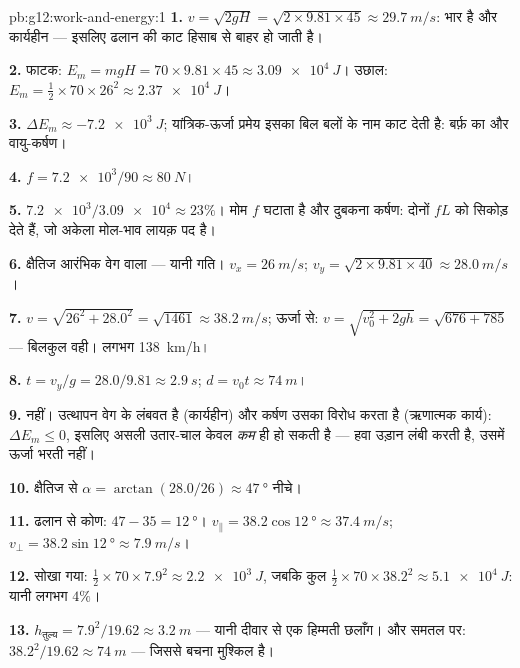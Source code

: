 \begin{solution}{pb:g12:work-and-energy:1}
\textbf{1.} $v = \sqrt{2gH} = \sqrt{2 \times 9.81 \times 45} \approx
\qty{29.7}{m/s}$: भार  है और 
कार्यहीन --- इसलिए ढलान की काट हिसाब से बाहर हो जाती है।

\textbf{2.} फाटक: $E_m = mgH = 70 \times 9.81 \times 45 \approx
\qty{3.09e4}{J}$। उछाल: $E_m = \tfrac12 \times 70 \times 26^2
\approx \qty{2.37e4}{J}$।

\textbf{3.} $\Delta E_m \approx \qty{-7.2e3}{J}$; यांत्रिक-ऊर्जा प्रमेय इसका बिल 
बलों के नाम काट देती है: बर्फ़ का  और वायु-कर्षण।

\textbf{4.} $f = \num{7.2e3}/90 \approx \qty{80}{N}$।

\textbf{5.} $\num{7.2e3}/\num{3.09e4} \approx 23\%$। मोम $f$ घटाता है और दुबकना कर्षण: दोनों $fL$ को
सिकोड़ देते हैं, जो अकेला मोल-भाव लायक़ पद है।

\textbf{6.} क्षैतिज आरंभिक वेग वाला  --- यानी
 गति। $v_x = \qty{26}{m/s}$; $v_y = \sqrt{2 \times 9.81 \times 40} \approx \qty{28.0}{m/s}$।

\textbf{7.} $v = \sqrt{26^2 + 28.0^2} = \sqrt{1461} \approx
\qty{38.2}{m/s}$; ऊर्जा से: $v = \sqrt{v_0^2 + 2gh} = \sqrt{676 + 785}$ --- बिलकुल वही। लगभग \qty{138}{km/h}।

\textbf{8.} $t = v_y/g = 28.0/9.81 \approx \qty{2.9}{s}$; $d = v_0 t \approx \qty{74}{m}$।

\textbf{9.} नहीं। उत्थापन वेग के लंबवत है (कार्यहीन) और कर्षण उसका विरोध करता
है (ऋणात्मक कार्य): $\Delta E_m \leq 0$, इसलिए असली उतार-चाल केवल \emph{कम} ही
हो सकती है --- हवा उड़ान लंबी करती है, उसमें ऊर्जा भरती नहीं।

\textbf{10.} क्षैतिज से $\alpha = \arctan(28.0/26) \approx \qty{47}{\degree}$ नीचे।

\textbf{11.} ढलान से कोण: $47 - 35 = \qty{12}{\degree}$। $v_\parallel = 38.2\cos\qty{12}{\degree} \approx \qty{37.4}{m/s}$; $v_\perp = 38.2\sin\qty{12}{\degree} \approx \qty{7.9}{m/s}$।

\textbf{12.} सोखा गया: $\tfrac12 \times 70 \times 7.9^2 \approx
\qty{2.2e3}{J}$, जबकि कुल $\tfrac12 \times 70 \times 38.2^2 \approx
\qty{5.1e4}{J}$: यानी लगभग $4\%$।

\textbf{13.} $h_{\text{तुल्य}} = 7.9^2/19.62 \approx \qty{3.2}{m}$ --- यानी दीवार से एक हिम्मती छलाँग। और समतल पर: $38.2^2/19.62 \approx \qty{74}{m}$
--- जिससे बचना मुश्किल है।


\end{solution}
